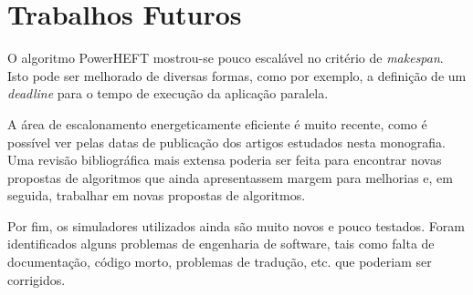 \section{Trabalhos Futuros} %
\label{sec:trabalhos_futuros}

O algoritmo PowerHEFT mostrou-se pouco escalável no critério de \emph{makespan}.
Isto pode ser melhorado de diversas formas, como por exemplo, a definição de um
\emph{deadline} para o tempo de execução da aplicação paralela.

A área de escalonamento energeticamente eficiente é muito recente, como é
possível ver pelas datas de publicação dos artigos estudados nesta monografia.
Uma revisão bibliográfica mais extensa poderia ser feita para encontrar novas
propostas de algoritmos que ainda apresentassem margem para melhorias e, 
em seguida, trabalhar em novas propostas de algoritmos.

Por fim, os simuladores utilizados ainda são muito novos e pouco testados.
Foram identificados alguns problemas de engenharia de software, tais como falta
de documentação, código morto, problemas de tradução, etc. que poderiam ser
corrigidos.

